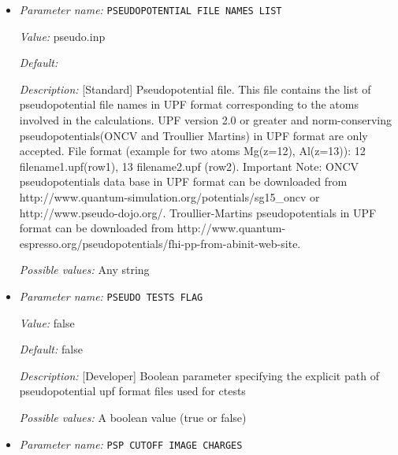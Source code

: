 \begin{itemize}
{\it Value:} true


{\it Default:} true


{\it Description:} [Standard] Boolean Parameter specifying whether pseudopotential DFT calculation needs to be performed. For all-electron DFT calculation set to false.


{\it Possible values:} A boolean value (true or false)
\item {\it Parameter name:} {\tt PSEUDOPOTENTIAL FILE NAMES LIST}
\label{parameters:DFT functional parameters/PSEUDOPOTENTIAL FILE NAMES LIST}
\label{parameters:DFT_20functional_20parameters/PSEUDOPOTENTIAL_20FILE_20NAMES_20LIST}


{\it Value:} pseudo.inp


{\it Default:} 


{\it Description:} [Standard] Pseudopotential file. This file contains the list of pseudopotential file names in UPF format corresponding to the atoms involved in the calculations. UPF version 2.0 or greater and norm-conserving pseudopotentials(ONCV and Troullier Martins) in UPF format are only accepted. File format (example for two atoms Mg(z=12), Al(z=13)): 12 filename1.upf(row1), 13 filename2.upf (row2). Important Note: ONCV pseudopotentials data base in UPF format can be downloaded from http://www.quantum-simulation.org/potentials/sg15_oncv or http://www.pseudo-dojo.org/.  Troullier-Martins pseudopotentials in UPF format can be downloaded from http://www.quantum-espresso.org/pseudopotentials/fhi-pp-from-abinit-web-site.


{\it Possible values:} Any string
\item {\it Parameter name:} {\tt PSEUDO TESTS FLAG}
\label{parameters:DFT functional parameters/PSEUDO TESTS FLAG}
\label{parameters:DFT_20functional_20parameters/PSEUDO_20TESTS_20FLAG}


{\it Value:} false


{\it Default:} false


{\it Description:} [Developer] Boolean parameter specifying the explicit path of pseudopotential upf format files used for ctests


{\it Possible values:} A boolean value (true or false)
\item {\it Parameter name:} {\tt PSP CUTOFF IMAGE CHARGES}
\label{parameters:DFT functional parameters/PSP CUTOFF IMAGE CHARGES}
\label{parameters:DFT_20functional_20parameters/PSP_20CUTOFF_20IMAGE_20CHARGES}



\end{itemize}
